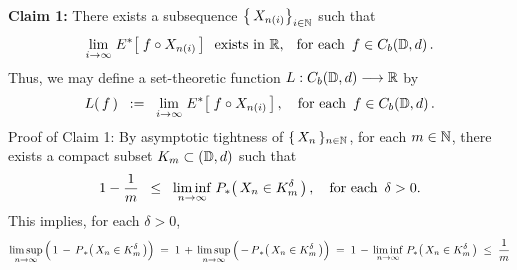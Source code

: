 \vskip 0.8cm
\noindent
\textbf{Claim 1:}\;\;
There exists a subsequence $\left\{\,X_{n(i)}\right\}_{i\in\mathbb{N}}$ such that
\begin{equation*}
\underset{i\rightarrow\infty}{\lim}\; E^{*}\!\left[\; f \circ X_{n(i)} \,\right]
\;\;\textnormal{exists in $\mathbb{R}$, \; for each \,$f \in C_{b}(\mathbb{D},d)$}\,.
\end{equation*}
Thus, we may define a set-theoretic function $L : C_{b}(\mathbb{D},d) \longrightarrow \mathbb{R}$ by
\begin{equation*}
L(\,f\,)
\;\; := \;\;
	\underset{i\rightarrow\infty}{\lim}\; E^{*}\!\left[\; f \circ X_{n(i)} \,\right],
\quad
\textnormal{for each \,$f \in C_{b}(\mathbb{D},d)$}\,.
\end{equation*}
Proof of Claim 1:\;\;
By asymptotic tightness of $\{\,X_{n}\,\}_{n\in\mathbb{N}}$, for each $m \in \mathbb{N}$,
there exists a compact subset $K_{m} \subset (\mathbb{D},d)$ such that
\begin{equation*}
1 - \dfrac{1}{m}
\;\; \leq \;\;
	\underset{n\rightarrow\infty}{\liminf}\;
	P_{*}\!\left(\,X_{n} \in K_{m}^{\delta}\,\right),
\quad
\textnormal{for each \,$\delta > 0$}.
\end{equation*}
This implies, for each $\delta > 0$,
\begin{equation}\label{limsupLeqOneOverM}
\underset{n\rightarrow\infty}{\limsup}\left(\,1\,-\,\overset{{\color{white}.}}{P}_{*}\!\left(\,X_{n} \in K_{m}^{\delta}\,\right)\right)
\; = \;
	1 \,+\, \underset{n\rightarrow\infty}{\limsup}\left(\,-\,\overset{{\color{white}.}}{P}_{*}\!\left(\,X_{n} \in K_{m}^{\delta}\,\right)\right)
\; = \;
	1 \,-\, \underset{n\rightarrow\infty}{\liminf}\;P_{*}\!\left(\,X_{n} \in K_{m}^{\delta}\,\right)
\; \leq \;
	\dfrac{1}{m}
\end{equation}

